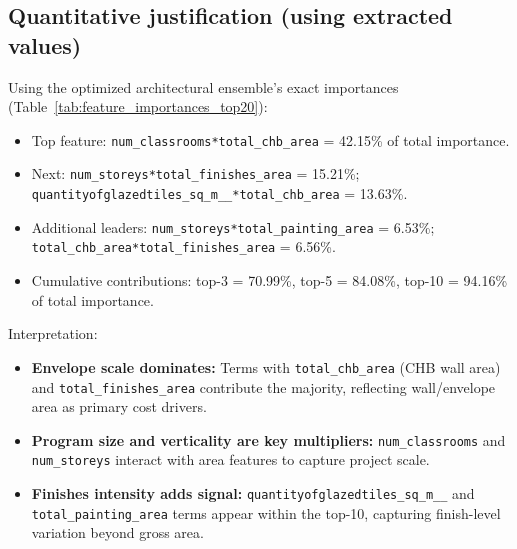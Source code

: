 \documentclass[11pt]{article}
\begin{document}
\subsection*{Quantitative justification (using extracted values)}
Using the optimized architectural ensemble’s exact importances (Table~\ref{tab:feature_importances_top20}):
\begin{itemize}
  \item Top feature: \verb|num_classrooms*total_chb_area| = 42.15\% of total importance.
  \item Next: \verb|num_storeys*total_finishes_area| = 15.21\%; \verb|quantityofglazedtiles_sq_m__*total_chb_area| = 13.63\%.
  \item Additional leaders: \verb|num_storeys*total_painting_area| = 6.53\%; \verb|total_chb_area*total_finishes_area| = 6.56\%.
  \item Cumulative contributions: top-3 = 70.99\%, top-5 = 84.08\%, top-10 = 94.16\% of total importance.
\end{itemize}
Interpretation:
\begin{itemize}
  \item \textbf{Envelope scale dominates:} Terms with \verb|total_chb_area| (CHB wall area) and \verb|total_finishes_area| contribute the majority, reflecting wall/envelope area as primary cost drivers.
  \item \textbf{Program size and verticality are key multipliers:} \verb|num_classrooms| and \verb|num_storeys| interact with area features to capture project scale.
  \item \textbf{Finishes intensity adds signal:} \verb|quantityofglazedtiles_sq_m__| and \verb|total_painting_area| terms appear within the top-10, capturing finish-level variation beyond gross area.
\end{itemize}
\end{document}
